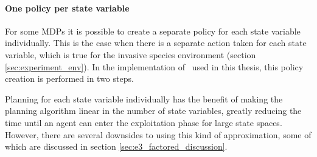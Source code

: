 \paragraph{One policy per state variable}
\label{sec:one_policy_per_state_variable}

For some MDPs it is possible to create a separate policy for each state
variable individually. This is the case when there is a separate action taken
for each state variable, which is true for the invasive species environment
(section \ref{sec:experiment_env}). In the implementation of \etre\ used in
this thesis, this policy creation is performed in two steps. 

Planning for each state variable individually has the benefit of making the planning algorithm linear in the number of state variables, greatly reducing the time until an agent can enter the exploitation phase for large state spaces. However, there are several downsides to using this kind of approximation, some of which are discussed in section \ref{sec:e3_factored_discussion}.
